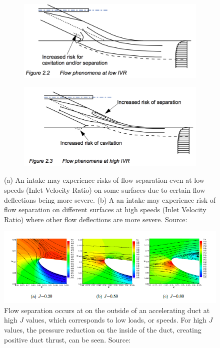 \documentclass{article}\usepackage[]{graphicx}\usepackage[]{color}
\begin{document}
\begin{figure}[h]

\begin{subfigure}{0.5\textwidth}
\includegraphics[width=0.9\linewidth]{LowIVR.png}
\caption{}
\end{subfigure}
\begin{subfigure}{0.5\textwidth}
\includegraphics[width=0.9\linewidth]{HighIVR.png}
\caption{}
\end{subfigure}

\caption{(a) An intake may experience risks of flow separation even at low speeds (Inlet Velocity Ratio) on some surfaces due to certain flow deflections being more severe. (b) A an intake may experience risk of flow separation on different surfaces at high speeds (Inlet Velocity Ratio) where other flow deflections are more severe. Source: \cite{bulten2006numerical}}
\label{fig:LowIVR.png}
\end{figure}



\begin{figure}[h]
\includegraphics[width=\textwidth]{DuctSeparation.png}
\caption{Flow separation occurs at on the outside of an accelerating duct at high $J$ values, which corresponds to low loads, or speeds. For high $J$ values, the pressure reduction on the inside of the duct, creating positive duct thrust, can be seen. Source: \cite[73]{willemsen2013}}
\label{fig:DuctSeparation.png}
\end{figure}
\end{document}
